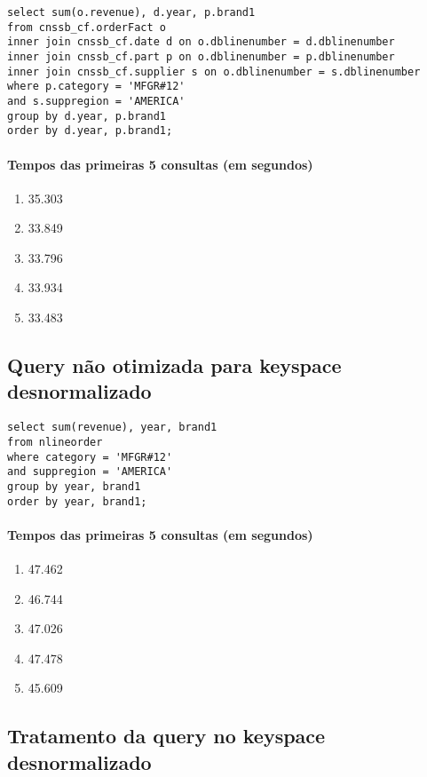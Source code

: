 \documentclass[12pt]{article}
\begin{document}
\begin{lstlisting}
select sum(o.revenue), d.year, p.brand1
from cnssb_cf.orderFact o
inner join cnssb_cf.date d on o.dblinenumber = d.dblinenumber
inner join cnssb_cf.part p on o.dblinenumber = p.dblinenumber 
inner join cnssb_cf.supplier s on o.dblinenumber = s.dblinenumber
where p.category = 'MFGR#12'
and s.suppregion = 'AMERICA'
group by d.year, p.brand1
order by d.year, p.brand1;
\end{lstlisting}

\paragraph{Tempos das primeiras 5 consultas (em segundos)}
\begin{enumerate}
\item 35.303
\item 33.849 
\item 33.796 
\item 33.934 
\item 33.483
\end{enumerate}

\subsection{Query não otimizada para keyspace desnormalizado}

\begin{lstlisting}
select sum(revenue), year, brand1
from nlineorder
where category = 'MFGR#12'
and suppregion = 'AMERICA'
group by year, brand1
order by year, brand1;
\end{lstlisting}

\paragraph{Tempos das primeiras 5 consultas (em segundos)}
\begin{enumerate}
\item 47.462 
\item 46.744 
\item 47.026 
\item 47.478 
\item 45.609
\end{enumerate}

\subsection{Tratamento da query no keyspace desnormalizado}
\end{document}
